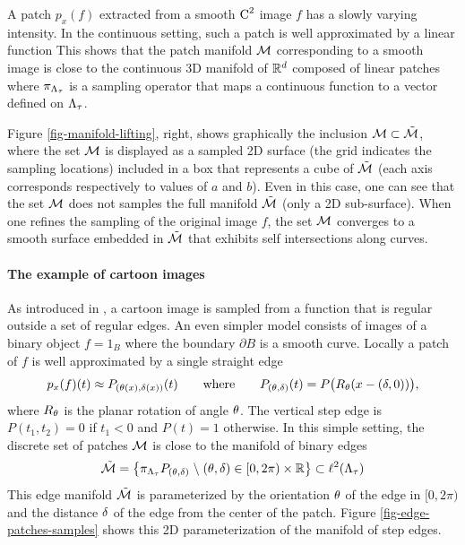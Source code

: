\documentclass[final]{siamltex}
\begin{document}
A patch $p_x(f)$ extracted from a smooth $\text{C}^{2}$ image $f$ has a slowly varying intensity. In the continuous setting, such a patch is well approximated by a linear function 
This shows that the patch manifold $\mathcal{M}$ corresponding to a smooth image is close to the continuous 3D manifold of $\mathbb{R}^d$ composed of linear patches
where $\pi_{\Lambda_\tau}$ is a sampling operator that maps a continuous function to a vector defined on $\Lambda_\tau$.

Figure \ref{fig-manifold-lifting}, right, shows graphically the inclusion $\mathcal{M} \subset \tilde {\mathcal{M}}$, where the set $\mathcal{M}$ is displayed as a sampled 2D surface (the grid indicates the sampling locations) included in a box that represents a cube of $\tilde {\mathcal{M}}$ (each axis corresponds respectively to values of $a$ and $b$). Even in this case, one can see that the set $\mathcal{M}$ does not samples the full manifold $\tilde {\mathcal{M}}$ (only a 2D sub-surface). When one refines the sampling of the original image $f$, the set $\mathcal{M}$ converges to a smooth surface embedded in $\tilde {\mathcal{M}}$ that exhibits self intersections along curves.

\paragraph{The example of cartoon images}


As introduced in \cite{donoho-wedglets}, a cartoon image is sampled from a function that is regular outside a set of regular edges. An even simpler model consists of images of a binary object $f = 1_{B}$ where the boundary $\partial B$ is a smooth curve. Locally a patch of $f$ is well approximated by a single straight edge 
\begin{equation*}
	p_x(f)(t) \approx P_{(\theta(x),\delta(x))}(t)
	\qquad \text{where} \qquad
	P_{(\theta,\delta)}(t) = P\big(  R_{\theta}(x - (\delta,0))  \big),
\end{equation*}
where $R_{\theta}$ is the planar rotation of angle $\theta$. The vertical step edge is $P(t_1,t_2)=0$ if $t_1<0$ and $P(t)=1$ otherwise. In this simple setting, the discrete set of patches $\mathcal{M}$ is close to the manifold of binary edges 
\begin{equation*}
	\tilde {\mathcal{M}} = \left\{ \pi_{\Lambda_\tau} P_{(\theta,\delta)} \;\backslash\; (\theta,\delta) \in [0,2\pi) \times \mathbb{R} \right\} \subset \ell^2(\Lambda_\tau)
\end{equation*}
This edge manifold $\tilde {\mathcal{M}}$ is parameterized by the orientation $\theta$ of the edge in $[0,2\pi)$ and the distance $\delta$ of the edge from the center of the patch. Figure \ref{fig-edge-patches-samples} shows this 2D parameterization of the manifold of step edges. 
\end{document}
